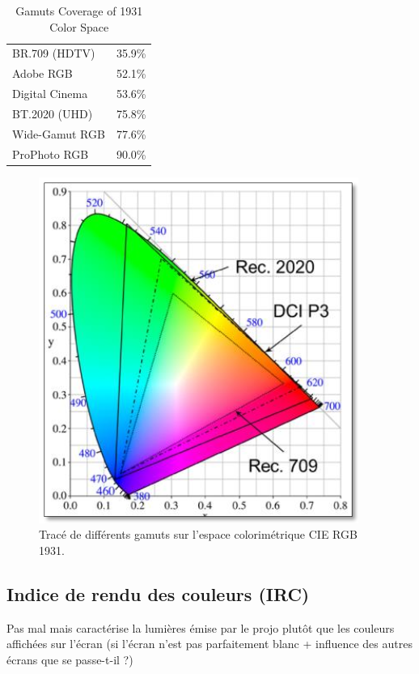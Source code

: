 	\begin{table}[h]	
		\centering
		\caption{Gamuts Coverage of 1931 Color Space}
		\label{tab:gamut}
		\small
		\begin{tabular}{ll}
			BR.709 (HDTV) & 35.9\%\\
			Adobe RGB & 52.1\%\\
			Digital Cinema & 53.6\%\\
			BT.2020 (UHD) & 75.8\%\\
			Wide-Gamut RGB & 77.6\%\\
			ProPhoto RGB & 90.0\%\\
		\end{tabular}
	\end{table}
	
	\begin{figure}
		\centering
		\includegraphics[scale=.9]{Figures/GamutBT2020}
		\caption{Tracé de différents gamuts sur l'espace colorimétrique CIE RGB 1931.}
		\label{fig:multi_gamut}
	\end{figure}
	
	\subsection{Indice de rendu des couleurs (IRC)}
	\par Pas mal mais caractérise la lumières émise par le projo plutôt que les couleurs affichées sur l'écran (si l'écran n'est pas parfaitement blanc + influence des autres écrans que se passe-t-il ?)
	
